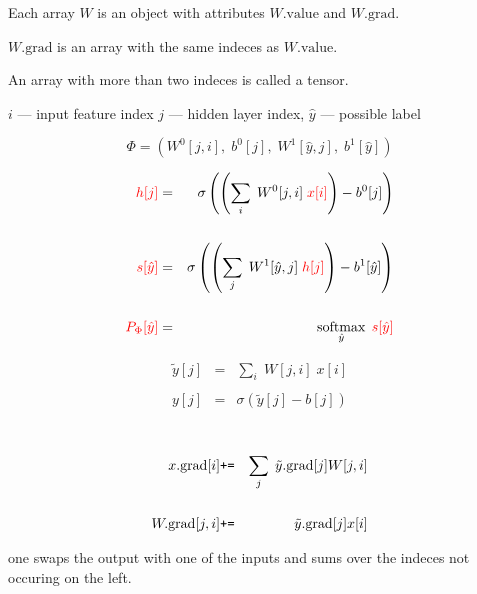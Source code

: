 {\vfill
Each array {\color{red} $W$} is an object with attributes {\color{red} $W.\mathrm{value}$} and {\color{red} $W.\mathrm{grad}$}.

\vfill
{\color{red} $W.\mathrm{grad}$} is an array with the same indeces as {\color{red} $W.\mathrm{value}$}.

\vfill
An array with more than two indeces is called a tensor.


\centerline{$i$ --- input feature index \hspace{1em} $j$  --- hidden layer index, \hspace{1em} $\hat{y}$ --- possible label}
$$\Phi = (W^0[j,i],\;b^0[j],\;W^1[\hat{y},j],\;b^1[\hat{y}])$$

\vfill
\begin{eqnarray*}
  {\color{red} h[j]} & = & \sigma\left(\left(\sum_i\;W^0[j,i] \;{\color{red} x[i]}\right) - b^0[j]\right) \\
  \\
  {\color{red} s[\hat{y}]} & = & \sigma\left(\left(\sum_j\;W^1[\hat{y},j]\;{\color{red} h[j]}\right) - b^1[\hat{y}]\right) \\
  \\
  {\color{red} P_\Phi[\hat{y}]} & = & \operatorname*{softmax}_{\hat{y}}\;{\color{red} s[\hat{y}]}
\end{eqnarray*}

\vspace{-3ex}
\begin{eqnarray*}
  \tilde{y}[j] & = & \sum_i\;W[j,i]\;x[i] \\
  \\
  y[j] & = & \sigma(\tilde{y}[j] - b[j]) \\
  \end{eqnarray*}

\vspace{-5ex}
{\color{red} 
  \begin{eqnarray*}
  \\
  x.\mathrm{grad}[i] & \mbox{\tt +=} & \sum_j\;\tilde{y}.\mathrm{grad}[j]W[j,i] \\
  \\
  W.\mathrm{grad}[j,i] & \mbox{\tt +=} & \tilde{y}.\mathrm{grad}[j]x[i]
\end{eqnarray*}
}

one swaps the output with one of the inputs and sums over the indeces not occuring on the left.


}
